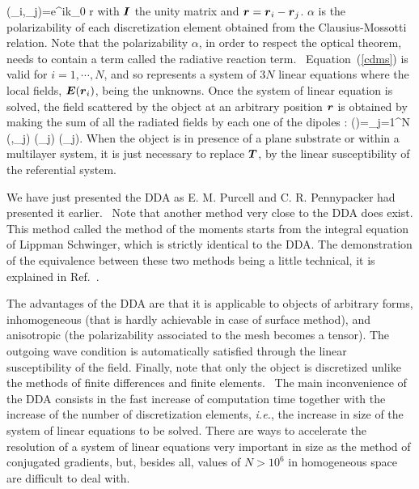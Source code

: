 \be {}(_i,_j)=e^{ik_0 r}
 \ee
with $\boldsymbol{I}$ the unity matrix and
$\boldsymbol{r}=\boldsymbol{r}_i-\boldsymbol{r}_j$. $\alpha$ is the polarizability of each
discretization element obtained from the Clausius-Mossotti
relation. Note that the polarizability $\alpha$, in order to respect
the optical theorem, needs to contain a term called the radiative
reaction term.~\cite{Draine_AJ_88} Equation~(\ref{cdms}) is valid for
$i=1,\cdots,N$, and so represents a system of $3N$ linear equations
where the local fields, $\boldsymbol{E}(\boldsymbol{r}_i)$, being the unknowns. Once
the system of linear equation is solved, the field scattered by the
object at an arbitrary position $\boldsymbol{r}$ is obtained by making the sum
of all the radiated fields by each one of the dipoles :
\be \label{cdmd} ()=\sum_{j=1}^{N} (,_j)
\alpha(_j) (_j). \ee
When the object is in presence of a plane substrate or within a
multilayer system, it is just necessary to replace $\boldsymbol{T}$, by the
linear susceptibility of the referential system.

We have just presented the DDA as E. M. Purcell and C. R. Pennypacker
had presented it earlier.~\cite{Purcell_AJ_73} Note that another
method very close to the DDA does exist. This method called the method
of the moments starts from the integral equation of Lippman Schwinger,
which is strictly identical to the DDA. The demonstration of the
equivalence between these two methods being a little technical, it is
explained in Ref.~\cite{Chaumet_PRE_04}.

The advantages of the DDA are that it is applicable to objects of
arbitrary forms, inhomogeneous (that is hardly achievable in case of
surface method), and anisotropic (the polarizability associated to the
mesh becomes a tensor). The outgoing wave condition is automatically
satisfied through the linear susceptibility of the field. Finally,
note that only the object is discretized unlike the methods of finite
differences and finite elements.~\cite{Kahnert_JQSRT_03} The main
inconvenience of the DDA consists in the fast increase of computation
time together with the increase of the number of discretization
elements, {\it i.e.}, the increase in size of the system of linear
equations to be solved.  There are ways to accelerate the resolution
of a system of linear equations very important in size as the method
of conjugated gradients, but, besides all, values of $N>10^6$ in
homogeneous space are difficult to deal with.

